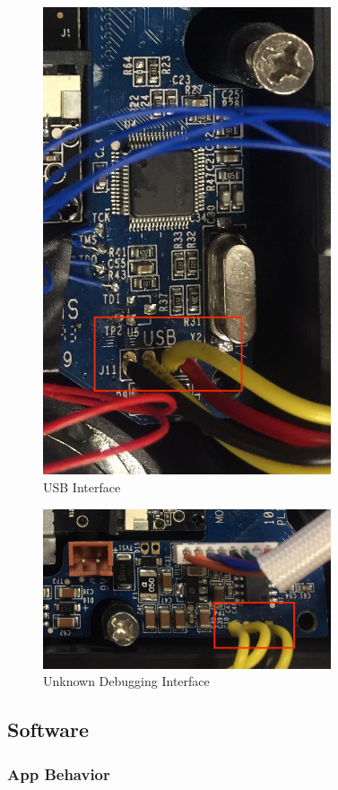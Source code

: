 \documentclass[conference]{IEEEtran}
\begin{document}
\begin{figure}[ht]
  \includegraphics[width=8.5cm]{images/USB.jpeg}
  \caption{USB Interface}
  \label{fig:usb}
\end{figure}

\begin{figure}[ht]
  \includegraphics[width=8.5cm]{images/UART.JPG}
  \caption{Unknown Debugging Interface}
  \label{fig:uart}
\end{figure}

\subsection{Software}
\subsubsection{App Behavior}
\end{document}
